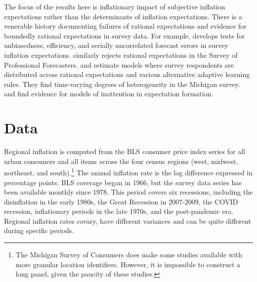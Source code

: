 \documentclass[12pt]{article}
\begin{document}
The focus of the results here is inflationary impact of subjective inflation expectations rather than the determinants of inflation expectations. There is a venerable history documenting failures of rational expectations and evidence for boundedly rational expectations in survey data. For example, \cite{EvansGulamani:OBES1984} develops tests for unbiasedness, efficiency, and serially uncorrelated forecast errors in survey inflation expectations. \cite{Carroll:QJE2003} similarly rejects rational expectations in the Survey of Professional Forecasters. \cite{BranchEJ2004} and \cite{Branch:JEDC2007} estimate models where survey respondents are distributed across rational expectations and various alternative adaptive learning rules. They find time-varying degrees of heterogeneity in the Michigan survey. \cite{CoibionGorodnichenko:AER2015} and \cite{CoibionGorodnichenko:JPE2012} find evidence for models of inattention in expectation formation.  

\section{Data}

Regional inflation is computed from the BLS consumer price index series for all urban consumers and all items across the four census regions (west, midwest, northeast, and south).\footnote{The Michigan Survey of Consumers does make some studies available with more granular location identifiers. However, it is impossible to construct a long panel, given the paucity of these studies.} The annual inflation rate is the log difference expressed in percentage points. BLS coverage began in 1966, but the survey data series has been available monthly since 1978. This period covers six recessions, including the disinflation in the early 1980s, the Great Recession in 2007-2009, the COVID recession, inflationary periods in the late 1970s, and the post-pandemic era. Regional inflation rates covary, have different variances and can be quite different during specific periods. 
\end{document}
